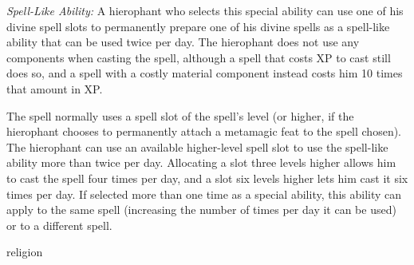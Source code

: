 {\textit{Spell-Like Ability:} A hierophant who selects this special ability can use one of his divine spell slots to permanently prepare one of his divine spells as a spell-like ability that can be used twice per day. The hierophant does not use any components when casting the spell, although a spell that costs XP to cast still does so, and a spell with a costly material component instead costs him 10 times that amount in XP.

The spell normally uses a spell slot of the spell’s level (or higher, if the hierophant chooses to permanently attach a metamagic feat to the spell chosen). The hierophant can use an available higher-level spell slot to use the spell-like ability more than twice per day. Allocating a slot three levels higher allows him to cast the spell four times per day, and a slot six levels higher lets him cast it six times per day. If selected more than one time as a special ability, this ability can apply to the same spell (increasing the number of times per day it can be used) or to a different spell.
}
{}
{religion}
{}
{}
{}